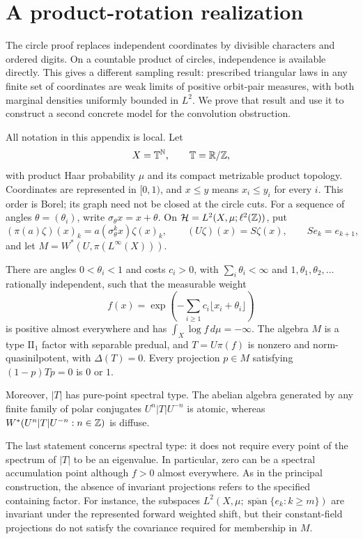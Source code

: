 \section{A product-rotation realization}\label{p:sec:product}

The circle proof replaces independent coordinates by divisible characters
and ordered digits.  On a countable product of circles, independence is
available directly.  This gives a different sampling result: prescribed
triangular laws in any finite set of coordinates are weak limits of
positive orbit-pair measures, with both marginal densities uniformly
bounded in $L^2$.  We prove that result and use it to construct a second
concrete model for the convolution obstruction.

All notation in this appendix is local.  Let
\[
 X=\mathbb T^{\mathbb N},\qquad \mathbb T=\mathbb R/\mathbb Z,
\]
with product Haar probability $\mu$ and its compact metrizable product
topology.  Coordinates are represented in $[0,1)$, and $x\le y$ means
$x_i\le y_i$ for every $i$.  This order is Borel; its graph need not be
closed at the circle cuts.  For a sequence of angles $\theta=(\theta_i)$,
write $\sigma_\theta x=x+\theta$.  On
$\mathcal H=L^2(X,\mu;\ell^2(\mathbb Z))$, put
\[
 (\pi(a)\zeta)(x)_k=a(\sigma_\theta^k x)\zeta(x)_k,
 \qquad (U\zeta)(x)=S\zeta(x),\qquad Se_k=e_{k+1},
\]
and let $M=W^*(U,\pi(L^\infty(X)))$.

\begin{theorem}\label{p:thm:model}
There are angles $0<\theta_i<1$ and costs $c_i>0$, with
$\sum_i\theta_i<\infty$ and $1,\theta_1,\theta_2,\ldots$ rationally
independent, such that the measurable weight
\[
 f(x)=\exp\left(-\sum_{i\ge1}c_i\lfloor x_i+\theta_i\rfloor\right)
\]
is positive almost everywhere and has $\int_X\log f\,d\mu=-\infty$.
The algebra $M$ is a type $\mathrm{II}_1$ factor with separable predual,
and $T=U\pi(f)$ is nonzero and norm-quasinilpotent, with
$\Delta(T)=0$.  Every projection $p\in M$ satisfying $(1-p)Tp=0$ is
$0$ or $1$.

Moreover, $|T|$ has pure-point spectral type.  The abelian algebra
generated by any finite family of polar conjugates
$U^n|T|U^{-n}$ is atomic, whereas
$W^*(U^n|T|U^{-n}:n\in\mathbb Z)$ is diffuse.
\end{theorem}

The last statement concerns spectral type: it does not require every
point of the spectrum of $|T|$ to be an eigenvalue.  In particular, zero
can be a spectral accumulation point although $f>0$ almost everywhere.
As in the principal construction, the absence of invariant projections
refers to the specified containing factor.  For instance, the subspaces
$L^2(X,\mu;\overline{\operatorname{span}}\{e_k:k\ge m\})$ are
invariant under the represented forward weighted shift, but their
constant-field projections do not satisfy the covariance required for
membership in $M$.

